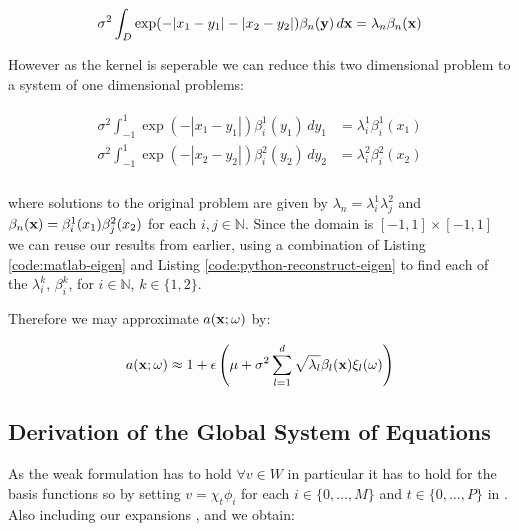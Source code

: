 \begin{equation}\label{eq:twod-stochastic-kl-eigenvalue-problem}
    \sigma^2\int_D\exp(-|x_1 - y_1| - |x_2 - y_2|)\beta_n(\mathbf{y})\, d\mathbf{x}
        = \lambda_n\beta_n(\mathbf{x})
\end{equation}

However as the kernel is seperable we can reduce this two dimensional problem
to a system of one dimensional problems:

\begin{align}
    \begin{split}
        \sigma^2\int_{-1}^1\exp(-|x_1 - y_1|)\beta^1_i(y_1)\, dy_1 &= \lambda^1_i\beta^1_i(x_1) \\
        \sigma^2\int_{-1}^1\exp(-|x_2 - y_2|)\beta^2_i(y_2)\, dy_2 &= \lambda^2_i\beta^2_i(x_2) \\
    \end{split}
\end{align}

where solutions to the original problem
 are given by $\lambda_n =
\lambda^1_i\lambda^2_j$ and $\beta_n(\mathbf{x}) = \beta^1_i(x_1)\beta^2_j(x_2)$ for
each $i, j \in \mathbb{N}$. Since the domain is $[-1, 1] \times [-1, 1]$ we can
reuse our results from earlier, using a combination of Listing
\ref{code:matlab-eigen} and Listing \ref{code:python-reconstruct-eigen} to find
each of the $\lambda_i^k$, $\beta_i^k$, for $i \in \mathbb{N}$, $k \in \{1,
2\}$.

Therefore we may approximate $a(\mathbf{x};\omega)$ by:

\begin{equation}\label{eq:twod-stochastic-kl-kappa}
    a(\mathbf{x};\omega) \approx 1 + \epsilon\left(
        \mu + \sigma^2\sum_{l=1}^d\sqrt{\lambda_l}\beta_l(\mathbf{x})\xi_l(\omega)
    \right)
\end{equation}

\subsection{Derivation of the Global System of Equations}

As the weak formulation  has to hold $\forall v
\in W$ in particular it has to hold for the basis functions so by setting
$v = \chi_t\phi_i$ for each $i \in \{0, \ldots, M\}$ and $t \in \{0, \ldots, P\}$
in . Also including our expansions
,  and
 we obtain:

